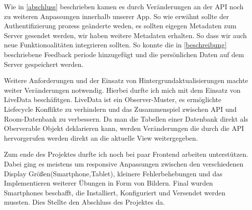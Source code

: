 Wie in \ref{abschluss} beschrieben kamen es durch Veränderungen an der API noch zu weiteren Anpassungen innerhalb unserer App. So wie erwähnt sollte der Authentifizierung prozess geänderte weden, es sollten eigegen Metadaten zum Server gesendet werden, wir haben weitere Metadaten erhalten. So dass wir auch neue Funktionoalitäten integrieren sollten. So konnte die in \ref{beschreibung} beschriebene Feedback periode hinzugefügt und die persönlichen Daten auf dem Server gespeichert werden.


Weitere Anforderungen und der Einsatz von Hintergrundaktualisierungen machte weiter Veränderungen notwendig. Hierbei durfte ich mich mit dem Einsatz von LiveData beschäfitgen. LiveData ist ein Observer-Muster, es ermöglichte  Liefecycle Konflikte zu verhindern und das Zusammenspiel zwischen API und Room-Datenbank zu verbessern. Da man die Tabellen einer Datenbank direkt als Oberverable Objekt deklarieren kann, werden Veränderungen die durch die  API hervorgerufen werden direkt  an die aktuelle View weitergegeben.

Zum ende des Projektes durfte ich  noch bei paar Frontend arbeiten unterstützen. Dabei ging es meistens um responsive Anpassungen zwischen den verschiedenen Display Größen(Smartphone,Tablet), kleinere Fehlerbehebungen und das Implementieren weiterer Übungen in Form von Bildern.%
Final wurden Smartphones beschafft, die Installiert, Konfiguriert und Versendet werden mussten. Dies Stellte den Abschluss des Projektes da.








